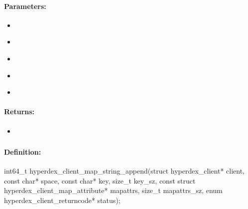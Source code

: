 \paragraph{Parameters:}
\begin{itemize}[noitemsep]
\item {}\\

\item {}\\

\item {}\\

\item {}\\

\item {}\\

\end{itemize}

\paragraph{Returns:}
\begin{itemize}[noitemsep]
\item {}\\

\end{itemize}

\pagebreak
\subsubsection{}
\label{api:c:map_string_append}


\paragraph{Definition:}
\begin{ccode}
int64_t hyperdex_client_map_string_append(struct hyperdex_client* client,
        const char* space,
        const char* key, size_t key_sz,
        const struct hyperdex_client_map_attribute* mapattrs, size_t mapattrs_sz,
        enum hyperdex_client_returncode* status);
\end{ccode}

